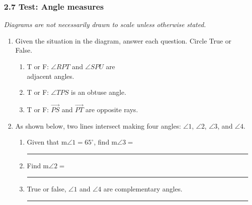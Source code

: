 

\fancyhead[LE]{\thepage}



\subsubsection*{2.7 Test: Angle measures}
\emph{Diagrams are not necessarily drawn to scale unless otherwise stated.}
\begin{enumerate}
\item Given the situation in the diagram, answer each question. Circle True or False. \vspace{0.25cm}
  \begin{multicols}{2}
    \begin{enumerate}
      \item T or F: $\angle RPT$ and $\angle SPU$ are \\adjacent angles. \bigskip
      \item T or F: $\angle TPS$ is an obtuse angle.\bigskip
      \item T or F: $\overrightarrow{PS}$ and $\overrightarrow{PT}$ are opposite rays.\bigskip
    \end{enumerate}
  \end{multicols}

\item As shown below, two lines intersect making four angles: $\angle 1$, $\angle 2$, $\angle 3$, and $\angle 4$.
  \begin{center}
  \end{center}
  \begin{enumerate}
    \item Given that m$\angle 1= 65^\circ$, find m$\angle 3=$ \rule{2.5cm}{0.15mm} \bigskip
    \item Find m$\angle 2=$ \rule{2.5cm}{0.15mm} \bigskip
    \item True or false, $\angle 1$ and $\angle 4$ are complementary angles. \rule{3cm}{0.15mm}
\end{enumerate}


\end{enumerate}
